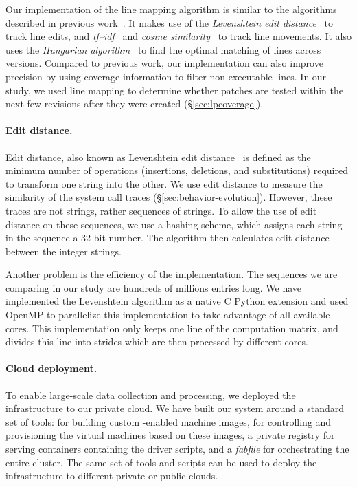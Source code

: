 Our implementation of the line mapping algorithm is similar to the
algorithms described in previous
work~\cite{szz:msr05,szz:ase06,change-source-code:msr07,szzrevisited:defects08}.
It makes use of the \emph{Levenshtein edit
  distance}~\cite{levenshtein1966binary} to track line edits, and
\emph{tf--idf}~\cite{tf-idf} and \emph{cosine
  similarity}~\cite{cosinesimilarity} to track line movements.  It
also uses the \emph{Hungarian algorithm}~\cite{hungarian} to find the
optimal matching of lines across versions.  Compared to previous work,
our implementation can also improve precision by using coverage information to filter
non-executable lines.
In our study, we used line mapping to determine whether patches are
tested within the next few revisions after they were created
(\S\ref{sec:lpcoverage}).

\paragraph{Edit distance.} Edit distance, also known as Levenshtein edit
distance~\cite{levenshtein1966binary} is defined as the minimum number of
operations (insertions, deletions, and substitutions) required to transform one
string into the other. We use edit distance to measure the similarity of the
system call traces (\S\ref{sec:behavior-evolution}). However, these traces are
not strings, rather sequences of strings. To allow the use of edit distance on
these sequences, we use a hashing scheme, which assigns each string in the
sequence a 32-bit number. The algorithm then calculates edit distance between
the integer strings.

Another problem is the efficiency of the implementation. The sequences we are
comparing in our study are hundreds of millions entries long. We have
implemented the Levenshtein algorithm as a native C Python extension and used
OpenMP to parallelize this implementation to take advantage of all available
cores. This implementation only keeps one line of the computation matrix, and
divides this line into strides which are then processed by different cores.

\paragraph{Cloud deployment.} To enable large-scale data collection and
processing, we deployed the infrastructure to our private cloud. We have built
our system around a standard set of tools: \packer for building custom
\docker-enabled machine images, \vagrant for controlling and provisioning the
virtual machines based on these images, a private \docker registry for serving
\docker containers containing the driver scripts, and a {\em fabfile} for
orchestrating the entire cluster. The same set of tools and scripts can be used
to deploy the infrastructure to different private or public clouds.

